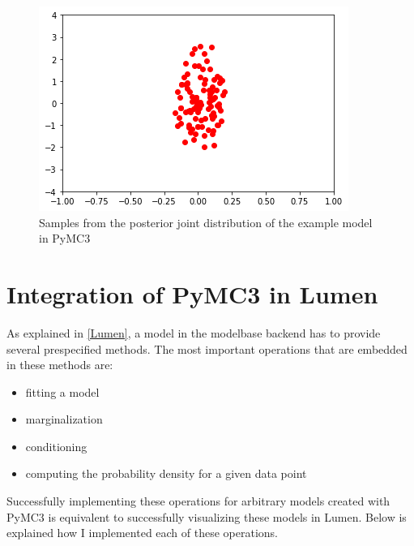 \documentclass{article}
\begin{document}
\begin{figure}
	\includegraphics[width=\textwidth]{images/PyMC3_joint_posterior_samples_simple_model.png}
	\caption[Samples from the posterior joint distribution of the example model in PyMC3]{Samples from the posterior joint distribution of the example model in PyMC3}
	\label{fig:PyMC3_joint_posterior_samples_simple_model}
\end{figure}

\section{Integration of PyMC3 in Lumen}
As explained in \autoref{Lumen}, a model in the modelbase backend has to provide several prespecified methods. The most important operations that are embedded in these methods are:
\begin{itemize}
	\item fitting a model
	\item marginalization
	\item conditioning
	\item computing the probability density for a given data point
\end{itemize}
Successfully implementing these operations for arbitrary models created with PyMC3 is equivalent to successfully visualizing these models in Lumen. Below is explained how I implemented each of these operations.
\end{document}
